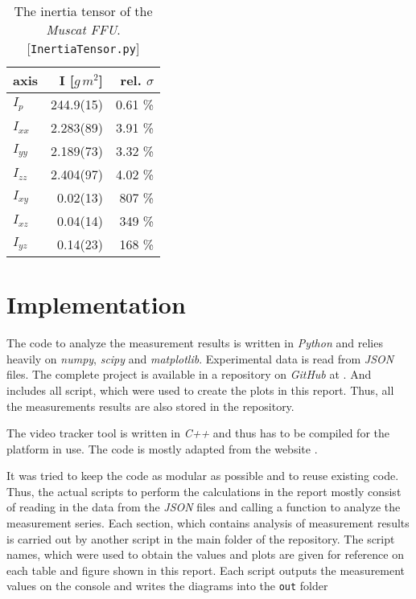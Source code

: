 \documentclass[journal]{IEEEtran}
\begin{document}
\begin{table}
	\centering
	\begin{tabular}{l | r r}
		axis	& I [$\unit{g\,m^2}$]		& rel. $\sigma$ \\
		\hline
		$I_p$		& 244.9(15)	& 0.61 \% \\
		$I_{xx}$	&	2.283(89)	& 3.91 \% \\
		$I_{yy}$	&	2.189(73)	& 3.32 \% \\
		$I_{zz}$	&	2.404(97)	& 4.02 \% \\
		$I_{xy}$	&	0.02(13)	& 807 \% \\
		$I_{xz}$	&	0.04(14)	& 349 \% \\
		$I_{yz}$	&	0.14(23)	& 168 \% \\
	\end{tabular}
	\caption{The inertia tensor of the \emph{Muscat FFU}. [\texttt{InertiaTensor.py}]}
	\label{tab:FFUInertiaTensor}
\end{table}

\section{Implementation}

The code to analyze the measurement results is written in \emph{Python} and relies heavily on \emph{numpy}, \emph{scipy} and \emph{matplotlib}.
Experimental data is read from \emph{JSON} files.
The complete project is available in a repository on \emph{GitHub} at \cite{website:github}.
And includes all script, which were used to create the plots in this report.
Thus, all the measurements results are also stored in the repository. 

The video tracker tool is written in \emph{C++} and thus has to be compiled for the platform in use. The code is mostly adapted from the website \cite{website:opencv}.

It was tried to keep the code as modular as possible and to reuse existing code. Thus, the actual scripts to perform the calculations in the report mostly consist of reading in the data from the \emph{JSON} files and calling a function to analyze the measurement series.
Each section, which contains analysis of measurement results is carried out by another script in the main folder of the repository. The script names, which were used to obtain the values and plots are given for reference on each table and figure shown in this report.
Each script outputs the measurement values on the console and writes the diagrams into the \texttt{out} folder 
\end{document}

